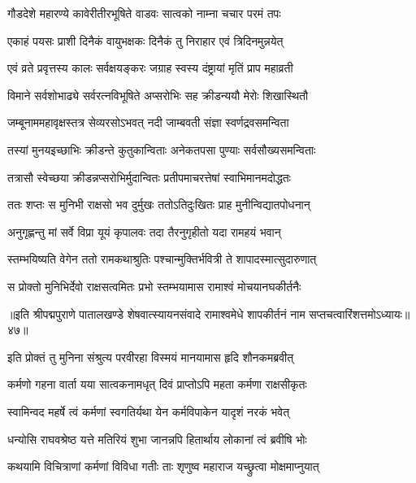 \twolineshloka
{गौडदेशे महारण्ये कावेरीतीरभूषिते}
{वाडवः सात्वको नाम्ना चचार परमं तपः}%

\twolineshloka
{एकाहं पयसः प्राशी दिनैकं वायुभक्षकः}
{दिनैकं तु निराहार एवं त्रिदिनमुन्नयेत्}%

\twolineshloka
{एवं व्रते प्रवृत्तस्य कालः सर्वक्षयङ्करः}
{जग्राह स्वस्य दंष्ट्रायां मृतिं प्राप महाव्रती}%

\twolineshloka
{विमाने सर्वशोभाढ्ये सर्वरत्नविभूषिते}
{अप्सरोभिः सह क्रीडन्ययौ मेरोः शिखास्थितौ}%

\twolineshloka
{जम्बूनाममहावृक्षस्तत्र सेव्यरसोऽभवत्}
{नदी जाम्बवती संज्ञा स्वर्णद्रवसमन्विता}%

\twolineshloka
{तस्यां मुनयइच्छाभिः क्रीडन्ते कुतुकान्विताः}
{अनेकतपसा पुण्याः सर्वसौख्यसमन्विताः}%

\twolineshloka
{तत्रासौ स्वेच्छया क्रीडन्नप्सरोभिर्मुदान्वितः}
{प्रतीपमाचरत्तेषां स्वाभिमानमदोद्धतः}%

\twolineshloka
{ततः शप्तः स मुनिभी राक्षसो भव दुर्मुखः}
{ततोऽतिदुःखितः प्राह मुनीन्विद्यातपोधनान्}%

\twolineshloka
{अनुगृह्णन्तु मां सर्वे विप्रा यूयं कृपालवः}
{तदा तैरनुगृहीतो यदा रामहयं भवान्}%

\twolineshloka
{स्तम्भयिष्यति वेगेन ततो रामकथाश्रुतिः}
{पश्चान्मुक्तिर्भवित्री ते शापादस्मात्सुदारुणात्}%

\twolineshloka
{स प्रोक्तो मुनिभिर्देवो राक्षसत्वमितः प्रभो}
{स्तम्भयामास रामाश्वं मोचयानघकीर्तनैः}%

॥इति श्रीपद्मपुराणे पातालखण्डे शेषवात्स्यायनसंवादे रामाश्वमेधे शापकीर्तनं नाम सप्तचत्वारिंशत्तमोऽध्यायः॥४७॥



\twolineshloka
{इति प्रोक्तं तु मुनिना संश्रुत्य परवीरहा}
{विस्मयं मानयामास हृदि शौनकमब्रवीत्}%


\twolineshloka
{कर्मणो गहना वार्ता यया सात्वकनामधृत्}
{दिवं प्राप्तोऽपि महता कर्मणा राक्षसीकृतः}%

\twolineshloka
{स्वामिन्वद महर्षे त्वं कर्मणां स्वगतिर्यथा}
{येन कर्मविपाकेन यादृशं नरकं भवेत्}%


\twolineshloka
{धन्योसि राघवश्रेष्ठ यत्ते मतिरियं शुभा}
{जानन्नपि हितार्थाय लोकानां त्वं ब्रवीषि भोः}%

\twolineshloka
{कथयामि विचित्राणां कर्मणां विविधा गतीः}
{ताः शृणुष्व महाराज यच्छ्रुत्वा मोक्षमाप्नुयात्}%

